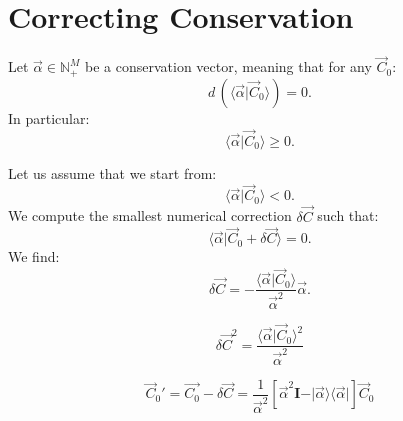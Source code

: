 \documentclass[aps,12pt]{revtex4}
\begin{document}
\section{Correcting Conservation}

Let $\vec{\alpha}\in\mathbb{N}_+^M$ be a conservation vector, meaning that for any $\vec{C}_0$:
\begin{equation}
d\,\left(\langle \vec{\alpha} \vert \vec{C}_0 \rangle\right) = 0.
\end{equation}
In particular:
\begin{equation}
	\langle \vec{\alpha} \vert \vec{C}_0 \rangle \geq 0.
\end{equation}

Let us assume that we start from:
\begin{equation}
	\langle \vec{\alpha} \vert \vec{C}_0 \rangle < 0.
\end{equation}
We compute the smallest numerical correction $\delta\vec{C}$ such that:
\begin{equation}
	\langle \vec{\alpha} \vert \vec{C}_0 + \delta\vec{C} \rangle = 0.
\end{equation}
We find:
\begin{equation}
	\delta\vec{C} =
	 -\dfrac{\langle \vec{\alpha} \vert \vec{C}_0 \rangle}{\vec{\alpha}^2}
	  \vec{\alpha}.
\end{equation}

\begin{equation}
	\delta\vec{C}^2 = \dfrac{\langle \vec{\alpha} \vert \vec{C}_0 \rangle^2}{\vec{\alpha}^2}
\end{equation}

\begin{equation}
	\vec{C}_0' = \vec{C_0} - \delta\vec{C} = \dfrac{1}{\vec{\alpha}^2}
	\left[ \vec{\alpha}^2 \bm{I} - \vert \vec{\alpha} \rangle \langle \vec{\alpha} \vert \right] \vec{C}_0
\end{equation}
\end{document}
